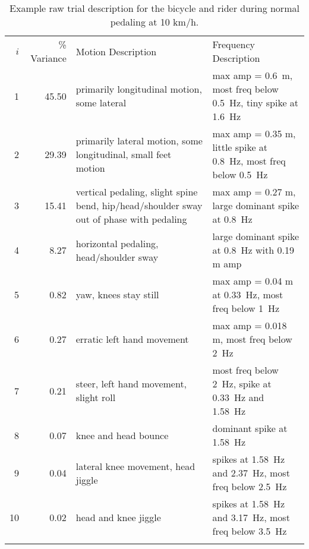\documentclass[smallextended]{svjour3}     %
\begin{document}
\begin{table}
    \caption{Example raw trial description for the bicycle and rider during normal pedaling at 10 km/h.}
    \label{tab:trialDesc}
    \centering
    {\small
	\begin{tabular}{rrp{40mm}p{40mm}}
	\hline\noalign{\smallskip}
        $i$ & \% Variance & Motion Description & Frequency Description\\
        \noalign{\smallskip}\hline\noalign{\smallskip}
        1  & 45.50 & primarily longitudinal motion, some lateral & max amp = 0.6~m, most freq below 0.5~Hz, tiny spike at 1.6~Hz\\
        2  & 29.39 & primarily lateral motion, some longitudinal, small feet motion & max amp = 0.35 m, little spike at 0.8~Hz, most freq below 0.5~Hz\\
        3  & 15.41 & vertical pedaling, slight spine bend, hip/head/shoulder
            sway out of phase with pedaling & max amp = 0.27 m, large dominant spike at 0.8~Hz\\
        4  & 8.27  & horizontal pedaling, head/shoulder sway & large dominant spike at 0.8~Hz with 0.19 m amp\\
        5  & 0.82  & yaw, knees stay still & max amp = 0.04 m at 0.33~Hz, most freq below 1~Hz\\
        6  & 0.27  & erratic left hand movement & max amp = 0.018 m, most freq below 2~Hz\\
        7  & 0.21  & steer, left hand movement, slight roll & most freq below 2~Hz, spike at 0.33~Hz and 1.58~Hz\\
        8  & 0.07  & knee and head bounce & dominant spike at 1.58~Hz\\
        9  & 0.04  & lateral knee movement, head jiggle & spikes at 1.58~Hz and 2.37~Hz, most freq below 2.5~Hz\\
        10 & 0.02  & head and knee jiggle & spikes at 1.58~Hz and 3.17~Hz, most freq below 3.5~Hz\\
	\noalign{\smallskip}\hline
        \end{tabular}
    }

\end{table}
\end{document}
